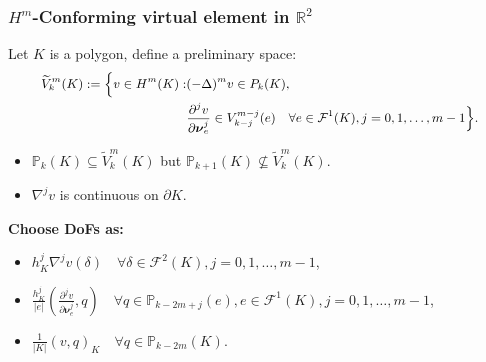 \documentclass[notheorems,serif]{beamer}
\begin{document}
\begin{frame}
\frametitle{$H^m$-Conforming virtual element in $\mathbb{R}^2$}
Let $K$ is a polygon, define a preliminary space:
$$
\small{
\begin{aligned}
  \widetilde{V}_k^m(K) := \Big\{v \in H^m(K) : & (-\Delta)^m v \in P_k(K),\\ 
      & \frac{\partial^j v}{\partial \boldsymbol{\nu}_e^j} \in V_{k-j}^{m-j}(e) \quad 
    \forall e \in \mathcal{F}^1(K), j=0, 1, \dots, m-1\Big\}.
\end{aligned}
}
$$
\begin{itemize}
    \item $\mathbb{P}_k(K) \subseteq \widetilde{V}_k^m(K)$ but 
        $\mathbb{P}_{k+1}(K) \not\subseteq \widetilde{V}_k^m(K)$.
    \item $\nabla^j v$ is continuous on $\partial K$.
\end{itemize}

\bf{Choose DoFs as}:
\begin{itemize}
    \item $h_K^j \nabla^{j}v(\delta) \quad \forall \delta \in \mathcal{F}^2(K),
        j = 0, 1, \dots, m-1$,
    \item $\frac{h_K^j}{|e|}(\frac{\partial^j v}{\partial \boldsymbol{\nu}_e^j}, q) \quad 
        \forall q \in \mathbb{P}_{k-2m+j}(e), e \in \mathcal{F}^1(K), 
        j = 0, 1, \dots, m-1$,
    \item $\frac{1}{|K|}(v, q)_K \quad \forall q \in \mathbb{P}_{k-2m}(K)$. 
\end{itemize}
\end{frame}
\end{document}

